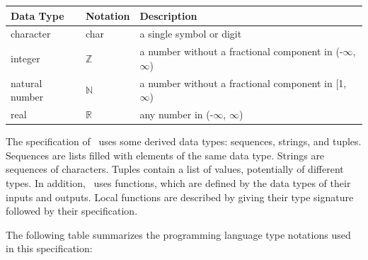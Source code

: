 \documentclass[12pt, titlepage]{article}
\begin{document}
\begin{center}
  \renewcommand{\arraystretch}{1.2}
  \noindent
  \begin{tabular}{l l p{7.5cm}}
    \toprule
    \textbf{Data Type} & \textbf{Notation} & \textbf{Description}                                             \\
    \midrule
    character          & char              & a single symbol or digit                                         \\
    integer            & $\mathbb{Z}$      & a number without a fractional component in (-$\infty$, $\infty$) \\
    natural number     & $\mathbb{N}$      & a number without a fractional component in [1, $\infty$)         \\
    real               & $\mathbb{R}$      & any number in (-$\infty$, $\infty$)                              \\
    \bottomrule
  \end{tabular}
\end{center}

\noindent
The specification of \progname \ uses some derived data types: sequences, strings, and
tuples. Sequences are lists filled with elements of the same data type. Strings
are sequences of characters. Tuples contain a list of values, potentially of
different types. In addition, \progname \ uses functions, which
are defined by the data types of their inputs and outputs. Local functions are
described by giving their type signature followed by their specification.

The following table summarizes the programming language type notations used in
this specification:
\end{document}

